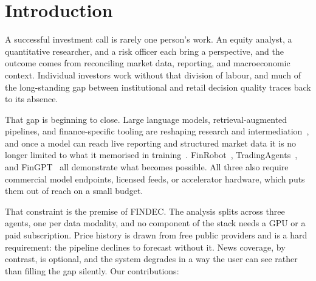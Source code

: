 \documentclass[conference]{IEEEtran}
\begin{document}
\section{Introduction}

A successful investment call is rarely one person's work. An equity analyst, a quantitative researcher, and a risk officer each bring a perspective, and the outcome comes from reconciling market data, reporting, and macroeconomic context. Individual investors work without that division of labour, and much of the long-standing gap between institutional and retail decision quality traces back to its absence.

That gap is beginning to close. Large language models, retrieval-augmented pipelines, and finance-specific tooling are reshaping research and intermediation~\cite{aldasoro2025intelligent, khan2025bridging}, and once a model can reach live reporting and structured market data it is no longer limited to what it memorised in training~\cite{qin2024toolllm, sinha2026finbloom}. FinRobot~\cite{yang2024finrobot}, TradingAgents~\cite{xiao2024tradingagents}, and FinGPT~\cite{yang2023fingpt} all demonstrate what becomes possible. All three also require commercial model endpoints, licensed feeds, or accelerator hardware, which puts them out of reach on a small budget.

That constraint is the premise of FINDEC. The analysis splits across three agents, one per data modality, and no component of the stack needs a GPU or a paid subscription. Price history is drawn from free public providers and is a hard requirement: the pipeline declines to forecast without it. News coverage, by contrast, is optional, and the system degrades in a way the user can see rather than filling the gap silently. Our contributions:
\end{document}

